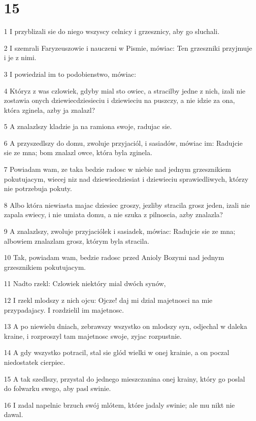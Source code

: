 \chapter{15}

\par 1 I przyblizali sie do niego wszyscy celnicy i grzesznicy, aby go sluchali.
\par 2 I szemrali Faryzeuszowie i nauczeni w Pismie, mówiac: Ten grzeszniki przyjmuje i je z nimi.
\par 3 I powiedzial im to podobienstwo, mówiac:
\par 4 Któryz z was czlowiek, gdyby mial sto owiec, a stracilby jedne z nich, izali nie zostawia onych dziewiecdziesieciu i dziewieciu na puszczy, a nie idzie za ona, która zginela, azby ja znalazl?
\par 5 A znalazlszy kladzie ja na ramiona swoje, radujac sie.
\par 6 A przyszedlszy do domu, zwoluje przyjaciól, i sasiadów, mówiac im: Radujcie sie ze mna; bom znalazl owce, która byla zginela.
\par 7 Powiadam wam, ze taka bedzie radosc w niebie nad jednym grzesznikiem pokutujacym, wiecej niz nad dziewiecdziesiat i dziewieciu sprawiedliwych, którzy nie potrzebuja pokuty.
\par 8 Albo która niewiasta majac dziesiec groszy, jezliby stracila grosz jeden, izali nie zapala swiecy, i nie umiata domu, a nie szuka z pilnoscia, azby znalazla?
\par 9 A znalazlszy, zwoluje przyjaciólek i sasiadek, mówiac: Radujcie sie ze mna; albowiem znalazlam grosz, którym byla stracila.
\par 10 Tak, powiadam wam, bedzie radosc przed Anioly Bozymi nad jednym grzesznikiem pokutujacym.
\par 11 Nadto rzekl: Czlowiek niektóry mial dwóch synów,
\par 12 I rzekl mlodszy z nich ojcu: Ojcze! daj mi dzial majetnosci na mie przypadajacy. I rozdzielil im majetnosc.
\par 13 A po niewielu dniach, zebrawszy wszystko on mlodszy syn, odjechal w daleka kraine, i rozproszyl tam majetnosc swoje, zyjac rozpustnie.
\par 14 A gdy wszystko potracil, stal sie glód wielki w onej krainie, a on poczal niedostatek cierpiec.
\par 15 A tak szedlszy, przystal do jednego mieszczanina onej krainy, który go poslal do folwarku swego, aby pasl swinie.
\par 16 I zadal napelnic brzuch swój mlótem, które jadaly swinie; ale mu nikt nie dawal.
